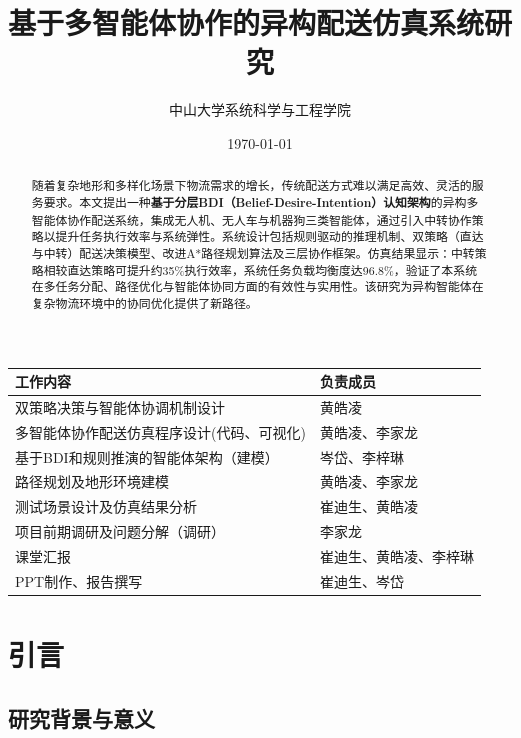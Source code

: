 \documentclass[12pt,a4paper]{article}
\title{基于多智能体协作的异构配送仿真系统研究}
\author{中山大学系统科学与工程学院}
\date{\today}
\begin{document}
\maketitle

\begin{table}[h]
\centering

\label{tab:team-division}
\begin{tabular}{|>{\centering\arraybackslash}p{6cm}|>{\centering\arraybackslash}p{8cm}|}
\hline
\textbf{工作内容} & \textbf{负责成员} \\
\hline
\rowcolor{lightgray}
双策略决策与智能体协调机制设计 & 黄皓凌 \\
\hline
多智能体协作配送仿真程序设计(代码、可视化) & 黄皓凌、李家龙 \\
\hline
\rowcolor{lightgray}
基于BDI和规则推演的智能体架构（建模） & 岑岱、李梓琳 \\
\hline
路径规划及地形环境建模 & 黄皓凌、李家龙 \\
\hline
\rowcolor{lightgray}
测试场景设计及仿真结果分析 & 崔迪生、黄皓凌 \\
\hline
项目前期调研及问题分解（调研） & 李家龙 \\
\hline
\rowcolor{lightgray}
课堂汇报 & 崔迪生、黄皓凌、李梓琳 \\
\hline
PPT制作、报告撰写 & 崔迪生、岑岱 \\
\hline
\end{tabular}
\end{table}

\begin{abstract}
随着复杂地形和多样化场景下物流需求的增长，传统配送方式难以满足高效、灵活的服务要求。本文提出一种\textbf{基于分层BDI（Belief-Desire-Intention）认知架构}的异构多智能体协作配送系统，集成无人机、无人车与机器狗三类智能体，通过引入中转协作策略以提升任务执行效率与系统弹性。系统设计包括规则驱动的推理机制、双策略（直达与中转）配送决策模型、改进A*路径规划算法及三层协作框架。仿真结果显示：中转策略相较直达策略可提升约35\%执行效率，系统任务负载均衡度达96.8\%，验证了本系统在多任务分配、路径优化与智能体协同方面的有效性与实用性。该研究为异构智能体在复杂物流环境中的协同优化提供了新路径。
\end{abstract}
\clearpage
\tableofcontents
\newpage

\section{引言}

\subsection{研究背景与意义}
\end{document}
